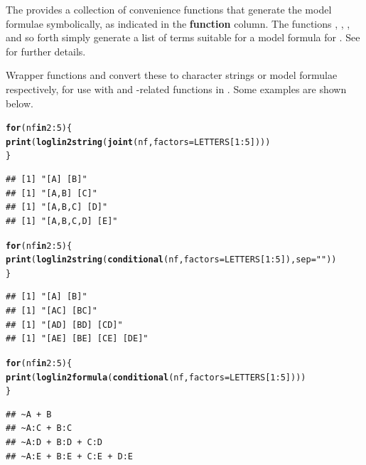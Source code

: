 \documentclass[11pt]{book}\usepackage[]{graphicx}\usepackage[]{color}
\makeatletter
\newcommand{\hlnum}[1]{\textcolor[rgb]{0.686,0.059,0.569}{#1}}%
\newcommand{\hlstr}[1]{\textcolor[rgb]{0.192,0.494,0.8}{#1}}%
\newcommand{\hlopt}[1]{\textcolor[rgb]{0,0,0}{#1}}%
\newcommand{\hlstd}[1]{\textcolor[rgb]{0.345,0.345,0.345}{#1}}%
\newcommand{\hlkwa}[1]{\textcolor[rgb]{0.161,0.373,0.58}{\textbf{#1}}}%
\newcommand{\hlkwc}[1]{\textcolor[rgb]{0.333,0.667,0.333}{#1}}%
\newcommand{\hlkwd}[1]{\textcolor[rgb]{0.737,0.353,0.396}{\textbf{#1}}}%
\newenvironment{kframe}{%
 \def\at@end@of@kframe{}%
 \ifinner\ifhmode%
  \def\at@end@of@kframe{\end{minipage}}%
  \begin{minipage}{\columnwidth}%
 \fi\fi%
 \def\FrameCommand##1{\hskip\@totalleftmargin \hskip-\fboxsep
 \colorbox{shadecolor}{##1}\hskip-\fboxsep
     \hskip-\linewidth \hskip-\@totalleftmargin \hskip\columnwidth}%
 \MakeFramed {\advance\hsize-\width
   \@totalleftmargin\z@ \linewidth\hsize
   \@setminipage}}%
 {\par\unskip\endMakeFramed%
 \at@end@of@kframe}
\newenvironment{knitrout}{}{} %
\renewenvironment{knitrout}{\small\renewcommand{\baselinestretch}{.85}}{} %
\makeatother
\begin{document}
The  provides a collection of convenience functions that generate
the \loglin model formulae symbolically, as indicated in the \textbf{function} column.
The functions , , , 
and so forth simply
generate a list of terms suitable for a model formula for .
See  for further details.

Wrapper functions  and 
convert these to character strings or model formulae respectively,
for use with  and -related functions in
.  Some examples are shown below.

\begin{knitrout}
\color{fgcolor}\begin{kframe}
\begin{alltt}
\hlkwa{for}\hlstd{(nf} \hlkwa{in} \hlnum{2}\hlopt{:}\hlnum{5}\hlstd{) \{}
  \hlkwd{print}\hlstd{(}\hlkwd{loglin2string}\hlstd{(}\hlkwd{joint}\hlstd{(nf,} \hlkwc{factors}\hlstd{=LETTERS[}\hlnum{1}\hlopt{:}\hlnum{5}\hlstd{])))}
\hlstd{\}}
\end{alltt}
\begin{verbatim}
## [1] "[A] [B]"
## [1] "[A,B] [C]"
## [1] "[A,B,C] [D]"
## [1] "[A,B,C,D] [E]"
\end{verbatim}
\begin{alltt}
\hlkwa{for}\hlstd{(nf} \hlkwa{in} \hlnum{2}\hlopt{:}\hlnum{5}\hlstd{) \{}
  \hlkwd{print}\hlstd{(}\hlkwd{loglin2string}\hlstd{(}\hlkwd{conditional}\hlstd{(nf,} \hlkwc{factors}\hlstd{=LETTERS[}\hlnum{1}\hlopt{:}\hlnum{5}\hlstd{]),} \hlkwc{sep}\hlstd{=}\hlstr{""}\hlstd{))}
\hlstd{\}}
\end{alltt}
\begin{verbatim}
## [1] "[A] [B]"
## [1] "[AC] [BC]"
## [1] "[AD] [BD] [CD]"
## [1] "[AE] [BE] [CE] [DE]"
\end{verbatim}
\begin{alltt}
\hlkwa{for}\hlstd{(nf} \hlkwa{in} \hlnum{2}\hlopt{:}\hlnum{5}\hlstd{) \{}
  \hlkwd{print}\hlstd{(}\hlkwd{loglin2formula}\hlstd{(}\hlkwd{conditional}\hlstd{(nf,} \hlkwc{factors}\hlstd{=LETTERS[}\hlnum{1}\hlopt{:}\hlnum{5}\hlstd{])))}
\hlstd{\}}
\end{alltt}
\begin{verbatim}
## ~A + B
## ~A:C + B:C
## ~A:D + B:D + C:D
## ~A:E + B:E + C:E + D:E
\end{verbatim}
\end{kframe}
\end{knitrout}
\end{document}
